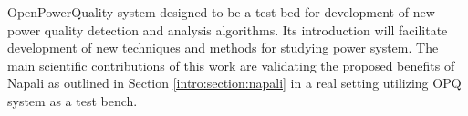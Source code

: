 OpenPowerQuality system designed to be a test bed for development of new power quality detection and analysis algorithms. Its introduction will facilitate development of new techniques and methods for studying power system. The main scientific contributions of this work are validating the proposed benefits of Napali as outlined in Section \ref{intro:section:napali} in a real setting utilizing OPQ system as a test bench.
